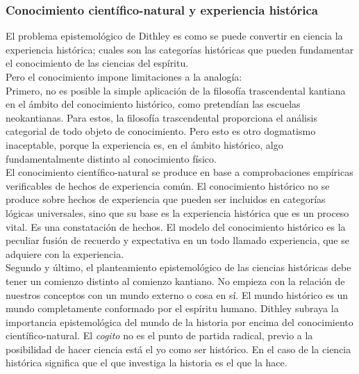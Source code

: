 \documentclass[a4paper, 11pt, twocolumn, spanish]{article}
\begin{document}
\subsubsection{Conocimiento científico-natural y experiencia histórica}
\label{sec:org13edf7e}
El problema epistemológico de Dithley es como se puede convertir en
ciencia la experiencia histórica; cuales son las categorías históricas
que pueden fundamentar el conocimiento de las ciencias del espíritu.\\[0pt]
Pero el conocimiento impone limitaciones a la analogía:\\[0pt]
Primero, no es posible la simple aplicación de la filosofía
trascendental kantiana en el ámbito del conocimiento histórico, como
pretendían las escuelas neokantianas. Para estos, la filosofía
trascendental proporciona el análisis categorial de todo objeto de
conocimiento. Pero esto es otro dogmatismo inaceptable, porque la
experiencia es, en el ámbito histórico, algo fundamentalmente distinto
al conocimiento físico.\\[0pt]
El conocimiento científico-natural se produce en base a comprobaciones
empíricas verificables de hechos de experiencia común. El conocimiento
histórico no se produce sobre hechos de experiencia que pueden ser
incluidos en categorías lógicas universales, sino que su base es la
experiencia histórica que es un proceso vital. Es una constatación de
hechos. El modelo del conocimiento histórico es la peculiar fusión de
recuerdo y expectativa en un todo llamado experiencia, que se adquiere
con la experiencia.\\[0pt]

Segundo y último, el planteamiento epistemológico de las ciencias
históricas debe tener un comienzo distinto al comienzo kantiano. No
empieza con la relación de nuestros conceptos con un mundo externo o
cosa en sí. El mundo histórico es un mundo completamente conformado
por el espíritu humano. Dithley subraya la importancia epistemológica
del mundo de la historia por encima del conocimiento
científico-natural. El \emph{cogito} no es el punto de partida radical,
previo a la posibilidad de hacer ciencia está el yo como ser
histórico. En el caso de la ciencia histórica significa que el que
investiga la historia es el que la hace.\\[0pt]
\end{document}
